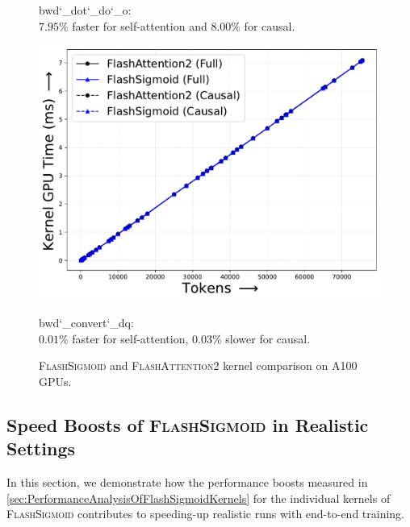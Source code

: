 \begin{figure}[!htbp]
\begin{minipage}{0.24\textwidth}
        \captionsetup{justification=centering} 
        \caption*{
            \textrm{bwd\char`_dot\char`_do\char`_o}:\\
            $7.95\%$ faster for self-attention and $8.00\%$ for causal.  
        }
    \end{minipage}
    \hfill
    \begin{minipage}{0.24\textwidth}
        \centering        
        \includegraphics[trim={0 0 0 0}, width=\textwidth]{figures/_flash_figures/final_arxiv/f2/individual/a100/A100_noalibi_flash_bwd_convert_dq_kernel_Full_0.01_0.04_Causal_-0.03_0.04.pdf}
        \captionsetup{justification=centering} 
        \caption*{
            \textrm{bwd\char`_convert\char`_dq}:\\
            $0.01\%$ faster for self-attention, $0.03\%$ slower for causal. 
        }
    \end{minipage}
    \caption{
        \textsc{FlashSigmoid} and \textsc{FlashAttention2} kernel comparison on A100 GPUs. 
    }
    \label{fig:a100-softmax-sigmoid-kernels}
\end{figure}
\subsection{Speed Boosts of \textsc{FlashSigmoid} in Realistic Settings}
\label{sec:SpeedBoostsOfFlashSigmoidInRealisticSettings}
\noindent In this section, we demonstrate how the performance boosts measured in \cref{sec:PerformanceAnalysisOfFlashSigmoidKernels} for the individual kernels of \textsc{FlashSigmoid} contributes to speeding-up realistic runs with end-to-end training. 

